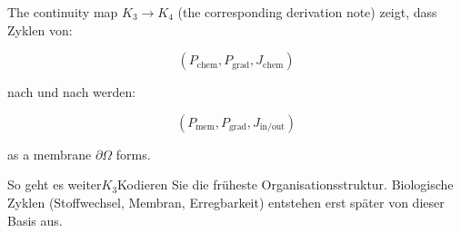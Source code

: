 The continuity map $K_3\to K_4$ (the corresponding derivation note)
zeigt, dass Zyklen von:

\[
  (P_{\mathrm{chem}}, P_{\mathrm{grad}}, J_{\mathrm{chem}})
\]

nach und nach werden:

\[
  (P_{\mathrm{mem}}, P_{\mathrm{grad}}, J_{\mathrm{in/out}})
\]

as a membrane $\partial\Omega$ forms.

So geht es weiter$K_3$Kodieren Sie die früheste Organisationsstruktur.
Biologische Zyklen (Stoffwechsel, Membran, Erregbarkeit) entstehen erst später
von dieser Basis aus.
